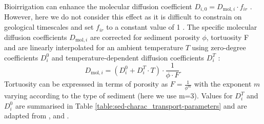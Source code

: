 \documentclass[gmd, manuscript]{copernicus}
\begin{document}
Bioirrigation can enhance the molecular diffusion coefficient $D_{i,0}=D_{\mathrm{mol},i}\cdot f_{ir}$ \citep{soetaert1996dynamic}. However, here we do not consider this effect as it is difficult to constrain on geological timescales
and set $f_{ir}$ to a constant value of 1 . The specific molecular diffusion coefficients $D_{\mathrm{mol},i}$ are corrected for sediment porosity $\phi$, tortuosity F and are linearly interpolated for an ambient temperature $T$ 
using zero-degree coefficients $D^0_i$ and temperature-dependent diffusion coefficients $D^T_i$ \citep[compare ][]{gypens_simple_2008}:
\begin{equation*}
 D_{\mathrm{mol},i} = (D^0_i + D^T_i \cdot T )\cdot \frac{1}{\phi\cdot F}.
\end{equation*}
Tortuosity can be expresssed in terms of porosity as $F = \frac{1}{\phi^m}$ \citep{ullman_diffusion_1982} with the exponent $m$ varying according to the type of sediment (here we use m=3). 
Values for $D^T_i$ and $D^0_i$ are summarised in Table \ref{table:sed-charac_transport-parameters} and are adapted from \citet{Li_diffusion_1974}, \citet{schulz_quantification_2006} and \citet{gypens_simple_2008}.
\end{document}
